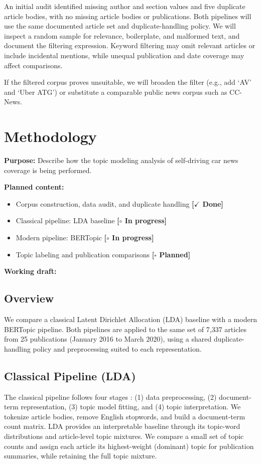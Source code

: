 \documentclass[conference]{IEEEtran}
\newcommand{\done}{\textcolor{green!40!black}{\textbf{[$\checkmark$ Done]}}}
\newcommand{\wip}{\textcolor{orange!70!black}{\textbf{[$\circ$ In progress]}}}
\newcommand{\planned}{\textcolor{blue!60!black}{\textbf{[$\square$ Planned]}}}
\begin{document}
An initial audit identified missing author and section values and five duplicate article bodies, with no missing article bodies or publications. Both pipelines will use the same documented article set and duplicate-handling policy. We will inspect a random sample for relevance, boilerplate, and malformed text, and document the filtering expression. Keyword filtering may omit relevant articles or include incidental mentions, while unequal publication and date coverage may affect comparisons.

If the filtered corpus proves unsuitable, we will broaden the filter (e.g., add ‘AV’ and ‘Uber ATG’) or substitute a comparable public news corpus such as CC-News.

\section*{Methodology}

\textbf{Purpose:} Describe how the topic modeling analysis of self-driving car news coverage is being performed.

\textbf{Planned content:}
\begin{itemize}
    \item Corpus construction, data audit, and duplicate handling \done
    \item Classical pipeline: LDA baseline \cite{blei2003lda} \wip
    \item Modern pipeline: BERTopic \wip
    \item Topic labeling and publication comparisons \planned
\end{itemize}

\textbf{Working draft:}
\subsection*{Overview}
We compare a classical Latent Dirichlet Allocation (LDA) baseline with a modern BERTopic pipeline. Both pipelines are applied to the same set of 7,337 articles from 25 publications (January 2016 to March 2020), using a shared duplicate-handling policy and preprocessing suited to each representation.

\subsection*{Classical Pipeline (LDA)}
The classical pipeline follows four stages \cite{qamar2024}: (1) data preprocessing, (2) document-term representation, (3) topic model fitting, and (4) topic interpretation. We tokenize article bodies, remove English stopwords, and build a document-term count matrix. LDA provides an interpretable baseline through its topic-word distributions and article-level topic mixtures. We compare a small set of topic counts and assign each article its highest-weight (dominant) topic for publication summaries, while retaining the full topic mixture.
\end{document}
